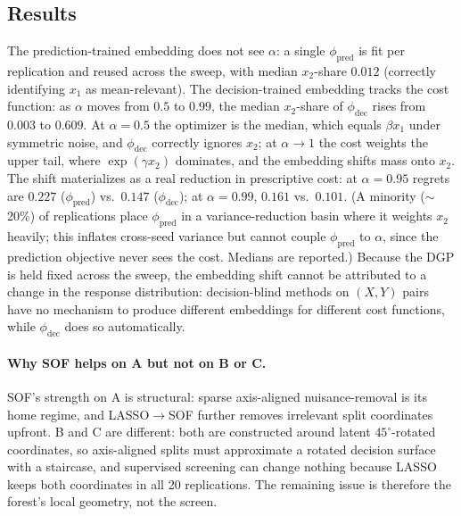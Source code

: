 \documentclass[11pt]{article}
\begin{document}
\subsection*{Results}
\begin{table}[H]
\centering
\small

\caption{Benchmark D summary across $\alpha$, over 20 replications. ``$x_2$-share'' is the diagonal Mahalanobis mass on the variance-relevant coordinate. $\phi_{\mathrm{pred}}$ is $\alpha$-independent by construction (its objective does not see $\alpha$); $\phi_{\mathrm{dec}}$ is refit per $\alpha$ and its median $x_2$-share rises from $0.003$ at $\alpha=0.5$ to $0.609$ at $\alpha=0.99$ even though the DGP is unchanged.}
\label{tab:benchmark_d_summary}
\end{table}

The prediction-trained embedding does not see $\alpha$: a single $\phi_{\mathrm{pred}}$ is fit per replication and reused across the sweep, with median $x_2$-share $0.012$ (correctly identifying $x_1$ as mean-relevant). The decision-trained embedding tracks the cost function: as $\alpha$ moves from $0.5$ to $0.99$, the median $x_2$-share of $\phi_{\mathrm{dec}}$ rises from $0.003$ to $0.609$. At $\alpha=0.5$ the optimizer is the median, which equals $\beta x_1$ under symmetric noise, and $\phi_{\mathrm{dec}}$ correctly ignores $x_2$; at $\alpha\to 1$ the cost weights the upper tail, where $\exp(\gamma x_2)$ dominates, and the embedding shifts mass onto $x_2$. The shift materializes as a real reduction in prescriptive cost: at $\alpha=0.95$ regrets are $0.227$ ($\phi_{\mathrm{pred}}$) vs.\ $0.147$ ($\phi_{\mathrm{dec}}$); at $\alpha=0.99$, $0.161$ vs.\ $0.101$. (A minority ($\sim$20\%) of replications place $\phi_{\mathrm{pred}}$ in a variance-reduction basin where it weights $x_2$ heavily; this inflates cross-seed variance but cannot couple $\phi_{\mathrm{pred}}$ to $\alpha$, since the prediction objective never sees the cost. Medians are reported.) Because the DGP is held fixed across the sweep, the embedding shift cannot be attributed to a change in the response distribution: decision-blind methods on $(X,Y)$ pairs have no mechanism to produce different embeddings for different cost functions, while $\phi_{\mathrm{dec}}$ does so automatically.

\paragraph{Why SOF helps on A but not on B or C.}
SOF's strength on A is structural: sparse axis-aligned nuisance-removal is its home regime, and LASSO$\to$SOF further removes irrelevant split coordinates upfront. B and C are different: both are constructed around latent $45^\circ$-rotated coordinates, so axis-aligned splits must approximate a rotated decision surface with a staircase, and supervised screening can change nothing because LASSO keeps both coordinates in all 20 replications. The remaining issue is therefore the forest's local geometry, not the screen.
\end{document}
